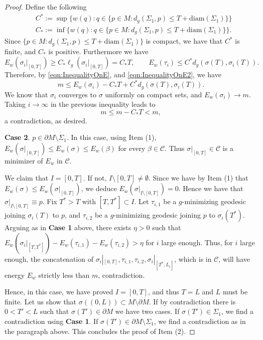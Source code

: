 \documentclass[12pt,a4paper,reqno]{amsart}
\theoremstyle{definition}
\renewcommand{\leq}{\leqslant}
\renewcommand{\geq}{\geqslant}
\begin{document}
{{\begin{proof}
Define the following
\begin{align*}
    &C^*:=\sup\{w(q):q\in \{p\in M:d_g(\Sigma_1,p)\leq T+\mathrm{diam}(\Sigma_1)\} \}\\
    &C_*:=\inf\{w(q):q\in \{p\in M:d_g(\Sigma_1,p)\leq T+\mathrm{diam}(\Sigma_1)\} \}.
\end{align*}
Since $\{p\in M:d_g(\Sigma_1,p)\leq T+\mathrm{diam}(\Sigma_1)\}$ is compact, we have that $C^*$ is finite, and $C_*$ is positive. Furthermore we have 
\begin{equation}\label{eqn:InequalityOnE2}
E_w(\sigma_{i}|_{[0,T]})\geq C_*\ell_g(\sigma_{i}|_{[0,T]}) = C_*T, \qquad E_w(\tau_i)\leq C^* d_g(\sigma(T),\sigma_{i}(T)).
\end{equation}
Therefore, by \eqref{eqn:InequalityOnE}, and \eqref{eqn:InequalityOnE2}, we have
\[
m\leq E_w(\sigma_{i}) - C_*T + C^*d_g(\sigma(T),\sigma_{i}(T)).
\]
We know that $\sigma_{i}$ converges to $\sigma$ uniformly on compact sets, and $E_w(\sigma_{i})\to m$. Taking $i\to\infty$ in the previous inequality leads to
\[
m\leq m-C_*T<m,
\]
a contradiction, as desired.

\textbf{Case 2}. $p\in \partial M\setminus \Sigma_1$. In this case, using Item (1), $E_w(\sigma|_{[0,T]})\leq E_w(\sigma)\leq E_w(\beta)$ for every $\beta\in\mathcal{C}$. Thus $\sigma|_{[0,T]}\in\mathcal{C}$ is a minimizer of $E_w$ in $\mathcal{C}$.

We claim that $I=[0,T]$. If not, $I\setminus [0,T]\neq \emptyset$. Since we have by Item (1) that $E_w(\sigma)\leq E_w(\sigma|_{[0,T]})$, we deduce $E_w(\sigma|_{I\setminus[0,T]})=0$. Hence we have that $\sigma|_{I\setminus [0,T]}\equiv p$. Fix $T^*>T$ with $[T,T^*]\subset I$. Let $\tau_{i,1}$ be a $g$-minimizing geodesic joining $\sigma_i(T)$ to $p$, and $\tau_{i,2}$ be a $g$-minimizing geodesic joining $p$ to $\sigma_i(T^*)$. Arguing as in \textbf{Case 1} above, there exists $\eta>0$ such that $E_w(\sigma_i|_{[T,T^*]})-E_w(\tau_{i,1})-E_w(\tau_{i,2})>\eta$ for $i$ large enough. Thus, for $i$ large enough, the concatenation of $\sigma_i|_{[0,T]},\tau_{i,1},\tau_{i,2},\sigma_i|_{[T^*,L_i]}$, which is in $\mathcal{C}$, will have energy $E_w$ strictly less than $m$, contradiction.

Hence, in this case, we have proved $I=[0,T]$, and thus $T=L$ and $L$ must be finite. Let us show that $\sigma((0,L))\subset M\setminus\partial M$. If by contradiction there is $0<T'<L$ such that $\sigma(T')\in\partial M$ we have two cases. If $\sigma(T')\in\Sigma_1$, we find a contradiction using \textbf{Case 1}. If $\sigma(T')\in \partial M\setminus\Sigma_1$, we find a contradiction as in the paragraph above. This concludes the proof of Item (2). 
\smallskip


\end{proof}}}
\end{document}
